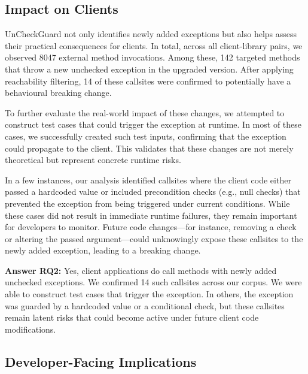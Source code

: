 \subsection{Impact on Clients}

UnCheckGuard not only identifies newly added exceptions but also helps assess their practical consequences for clients. In total, across all client-library pairs, we observed 8047 external method invocations. Among these, 142 targeted methods that throw a new unchecked exception in the upgraded version. After applying reachability filtering, 14 of these callsites were confirmed to potentially have a behavioural breaking change. 

To further evaluate the real-world impact of these changes, we attempted to construct test cases that could trigger the exception at runtime. In most of these cases, we successfully created such test inputs, confirming that the exception could propagate to the client. This validates that these changes are not merely theoretical but represent concrete runtime risks.

In a few instances, our analysis identified callsites where the client code either passed a hardcoded value or included precondition checks (e.g., null checks) that prevented the exception from being triggered under current conditions. While these cases did not result in immediate runtime failures, they remain important for developers to monitor. Future code changes—for instance, removing a check or altering the passed argument—could unknowingly expose these callsites to the newly added exception, leading to a breaking change.

\vspace{1em}
\begin{tcolorbox}[colback=gray!10, colframe=black]
\textbf{Answer RQ2:} Yes, client applications do call methods with newly added unchecked exceptions. We confirmed 14 such callsites across our corpus. We were able to construct test cases that trigger the exception. In others, the exception was guarded by a hardcoded value or a conditional check, but these callsites remain latent risks that could become active under future client code modifications.
\end{tcolorbox}
\vspace{1em}

\subsection{Developer-Facing Implications}

